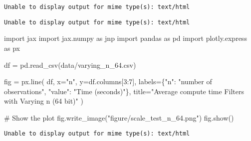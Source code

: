 \documentclass[
]{report}
\newenvironment{Shaded}{\begin{snugshade}}{\end{snugshade}}
\newcommand{\CommentTok}[1]{\textcolor[rgb]{0.37,0.37,0.37}{#1}}
\newcommand{\DecValTok}[1]{\textcolor[rgb]{0.68,0.00,0.00}{#1}}
\newcommand{\ImportTok}[1]{\textcolor[rgb]{0.00,0.46,0.62}{#1}}
\newcommand{\NormalTok}[1]{\textcolor[rgb]{0.00,0.23,0.31}{#1}}
\newcommand{\OperatorTok}[1]{\textcolor[rgb]{0.37,0.37,0.37}{#1}}
\newcommand{\StringTok}[1]{\textcolor[rgb]{0.13,0.47,0.30}{#1}}
\begin{document}
\begin{verbatim}
Unable to display output for mime type(s): text/html
\end{verbatim}

\begin{verbatim}
Unable to display output for mime type(s): text/html
\end{verbatim}

\begin{Shaded}
\begin{Highlighting}[]
\ImportTok{import}\NormalTok{ jax}
\ImportTok{import}\NormalTok{ jax.numpy }\ImportTok{as}\NormalTok{ jnp}
\ImportTok{import}\NormalTok{ pandas }\ImportTok{as}\NormalTok{ pd}
\ImportTok{import}\NormalTok{ plotly.express }\ImportTok{as}\NormalTok{ px}

\NormalTok{df }\OperatorTok{=}\NormalTok{ pd.read\_csv(}\StringTok{\textquotesingle{}data/varying\_n\_64.csv\textquotesingle{}}\NormalTok{)}

\NormalTok{fig }\OperatorTok{=}\NormalTok{ px.line(}
\NormalTok{    df, }
\NormalTok{    x}\OperatorTok{=}\StringTok{"n"}\NormalTok{,}
\NormalTok{    y}\OperatorTok{=}\NormalTok{df.columns[}\DecValTok{3}\NormalTok{:}\DecValTok{7}\NormalTok{], }
\NormalTok{    labels}\OperatorTok{=}\NormalTok{\{}\StringTok{"n"}\NormalTok{: }\StringTok{"number of observations"}\NormalTok{, }\StringTok{"value"}\NormalTok{: }\StringTok{"Time (seconds)"}\NormalTok{\},}
\NormalTok{    title}\OperatorTok{=}\StringTok{"Average compute time Filters with Varying n (64 bit)"}
\NormalTok{)}

\CommentTok{\# Show the plot}
\NormalTok{fig.write\_image(}\StringTok{"figure/scale\_test\_n\_64.png"}\NormalTok{)}
\NormalTok{fig.show()}
\end{Highlighting}
\end{Shaded}

\begin{verbatim}
Unable to display output for mime type(s): text/html
\end{verbatim}
\end{document}

